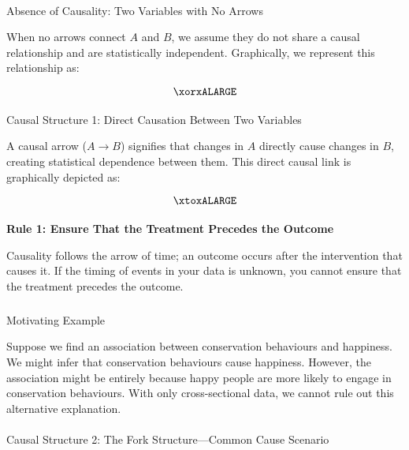 \documentclass[
  singlecolumn]{article}
\makeatletter
\let\oldparagraph\paragraph
\renewcommand{\paragraph}{
    \@ifstar
      \xxxParagraphStar
      \xxxParagraphNoStar
  }
\newcommand{\xxxParagraphStar}[1]{\oldparagraph*{#1}\mbox{}}
\newcommand{\xxxParagraphNoStar}[1]{\oldparagraph{#1}\mbox{}}
\let\oldsubparagraph\subparagraph
\renewcommand{\subparagraph}{
    \@ifstar
      \xxxSubParagraphStar
      \xxxSubParagraphNoStar
  }
\newcommand{\xxxSubParagraphStar}[1]{\oldsubparagraph*{#1}\mbox{}}
\newcommand{\xxxSubParagraphNoStar}[1]{\oldsubparagraph{#1}\mbox{}}
\makeatother
\begin{document}
\paragraph{Absence of Causality: Two Variables with No
Arrows}\label{absence-of-causality-two-variables-with-no-arrows}

When no arrows connect \(A\) and \(B\), we assume they do not share a
causal relationship and are statistically independent. Graphically, we
represent this relationship as:

\[
\xorxALARGE
\]

\paragraph{Causal Structure 1: Direct Causation Between Two
Variables}\label{causal-structure-1-direct-causation-between-two-variables}

A causal arrow (\(A \to B\)) signifies that changes in \(A\) directly
cause changes in \(B\), creating statistical dependence between them.
This direct causal link is graphically depicted as:

\[
\xtoxALARGE
\]

\paragraph{\texorpdfstring{\textbf{Rule 1: Ensure That the Treatment
Precedes the
Outcome}}{Rule 1: Ensure That the Treatment Precedes the Outcome}}\label{sec-four-rules}

Causality follows the arrow of time; an outcome occurs after the
intervention that causes it. If the timing of events in your data is
unknown, you cannot ensure that the treatment precedes the outcome.

\subparagraph{Motivating Example}\label{motivating-example}

Suppose we find an association between conservation behaviours and
happiness. We might infer that conservation behaviours cause happiness.
However, the association might be entirely because happy people are more
likely to engage in conservation behaviours. With only cross-sectional
data, we cannot rule out this alternative explanation.

\paragraph{Causal Structure 2: The Fork Structure---Common Cause
Scenario}\label{causal-structure-2-the-fork-structurecommon-cause-scenario}
\end{document}
